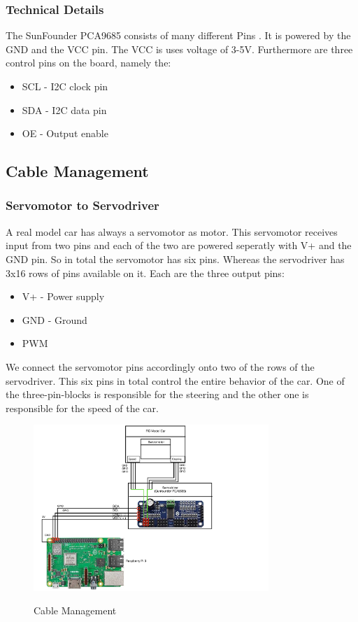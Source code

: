 \documentclass[journal]{IEEEtran}
\begin{document}
\subsubsection{Technical Details}
The SunFounder PCA9685 consists of many different Pins \cite{servo}. It is powered by the GND and the VCC pin. The VCC is uses voltage of 3-5V. Furthermore are three control pins on the board, namely the:

\begin{itemize}
\item SCL - I2C clock pin
\item SDA - I2C data pin 
\item OE - Output enable 
\end{itemize}

\subsection{Cable Management}
\subsubsection{Servomotor to Servodriver}
A real model car has always a servomotor as motor. This servomotor receives input from two pins and each of the two are powered seperatly with V+ and the GND pin. 
So in total the servomotor has six pins. Whereas the servodriver has 3x16 rows of pins available on it. Each are the three output pins:

\begin{itemize}
\item V+ - Power supply
\item GND - Ground
\item PWM
\end{itemize}

We connect the servomotor pins accordingly onto two of the rows of the servodriver. This six pins in total control the entire behavior of the car. One of the three-pin-blocks is responsible for the steering and the other one is responsible for the speed of the car. \\

\begin{figure}
  \begin{center}
  \includegraphics[width=3.5in]{photo/ebene2.pdf}\\
  \caption{Cable Management}\label{ebene2}
  \end{center}
\end{figure}
\end{document}
